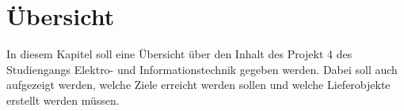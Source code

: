 	\clearpage
\section{Übersicht}\label{sec:Uebersicht}

In diesem Kapitel soll eine Übersicht über den Inhalt des Projekt 4 des Studiengangs Elektro- und Informationstechnik gegeben werden. Dabei soll auch aufgezeigt werden, welche Ziele erreicht werden sollen und welche Lieferobjekte erstellt werden müssen. 

 








